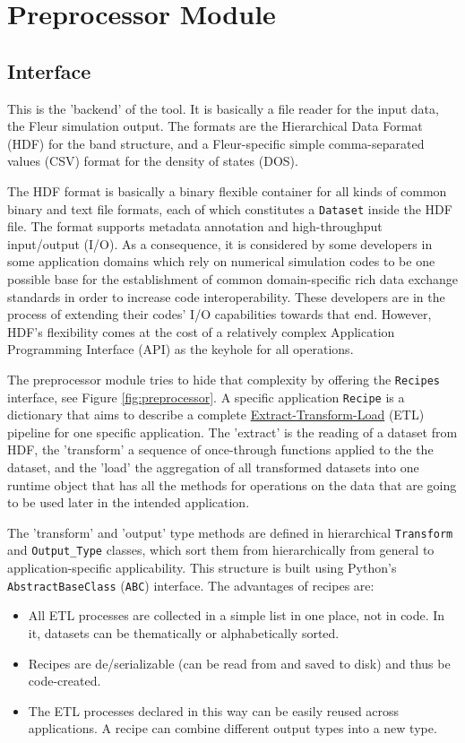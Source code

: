 \section{Preprocessor Module}
\label{sec:preprocessor-module}

\subsection{Interface}
\label{sec:preprocessor-interface}

This is the 'backend' of the tool. It is basically a file reader for the input
data, the Fleur simulation output. The formats are the Hierarchical Data Format
(HDF) \cite{hdf} for the band structure, and a Fleur-specific simple
comma-separated values (CSV) format for the density of states (DOS).

The HDF format is basically a binary flexible container for all kinds of common
binary and text file formats, each of which constitutes a \texttt{Dataset}
inside the HDF file. The format supports metadata annotation and high-throughput
input/output (I/O). As a consequence, it is considered by some developers in
some application domains which rely on numerical simulation codes to be one
possible base for the establishment of common domain-specific rich data exchange
standards in order to increase code interoperability. These developers are in
the process of extending their codes' I/O capabilities towards that end.
However, HDF's flexibility comes at the cost of a relatively complex Application
Programming Interface (API) as the keyhole for all operations.

The preprocessor module tries to hide that complexity by offering the
\texttt{Recipes} interface, see Figure \ref{fig:preprocessor}. A specific
application \texttt{Recipe} is a dictionary that aims to describe a complete
\href{https://en.wikipedia.org/wiki/Extract,_transform,_load}{Extract-Transform-Load}
(ETL) pipeline for one specific application. The 'extract' is the reading of a
dataset from HDF, the 'transform' a sequence of once-through functions applied
to the the dataset, and the 'load' the aggregation of all transformed datasets
into one runtime object that has all the methods for operations on the data that
are going to be used later in the intended application.

The 'transform' and 'output' type methods are defined in hierarchical
\texttt{Transform} and \texttt{Output\_Type} classes, which sort them from
hierarchically from general to application-specific applicability. This
structure is built using Python's \texttt{AbstractBaseClass} (\texttt{ABC})
interface. The advantages of recipes are:
\begin{itemize}
\item All ETL processes are collected in a simple list in one place, not in
    code. In it, datasets can be thematically or alphabetically sorted.
\item Recipes are de/serializable (can be read from and saved to disk) and thus be
    code-created.
\item The ETL processes declared in this way can be easily reused across
    applications. A recipe can combine different output types into a new type.
\end{itemize}

